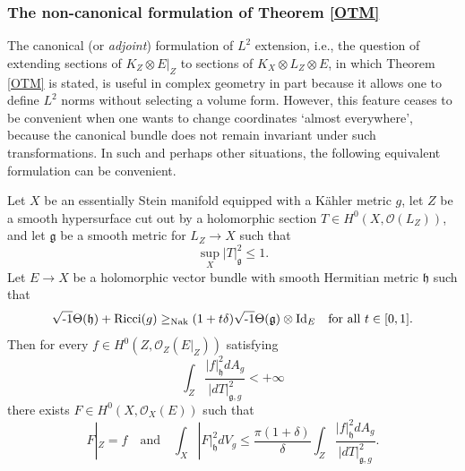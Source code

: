\documentclass[12pt,hidelinks]{amsart}
\newcommand{\cO}{{\mathcal O}}
\newcommand{\fg}{{\mathfrak g}}
\newcommand{\fh}{{\mathfrak h}}
\newcommand{\ii}{\sqrt{\text{\rm -}1}}
\newcommand{\tensor}{\otimes}
\begin{document}
\subsubsection{\sc The non-canonical formulation of Theorem \ref{OTM}}%

The canonical (or \emph{adjoint}) formulation of $L^2$ extension, i.e., the question of extending sections of $K_Z \tensor E|_Z$ to sections of $K_X \tensor L_Z \tensor E$, in which Theorem \ref{OTM} is stated, is useful in complex geometry in part because it allows one to define $L^2$ norms without selecting a volume form.  However, this feature ceases to be convenient when one wants to change coordinates `almost everywhere', because the canonical bundle does not remain invariant under such transformations.  In such and perhaps other situations, the following equivalent formulation can be convenient.

\begin{thm}\label{OTMnc}
Let $X$ be an essentially Stein manifold equipped with a K\"ahler metric $g$, let $Z$ be a smooth hypersurface cut out by a holomorphic section $T \in H^0(X, \cO (L_Z))$, and let $\fg$ be a smooth metric for $L_Z \to X$ such that 
\[
\sup _X |T|^2_{\fg} \le 1.
\]
Let $E \to X$ be a holomorphic vector bundle with smooth Hermitian metric $\fh$ such that 
\begin{equation}\label{curv-hyp-OTnc}
\ii \Theta (\fh) + {\rm Ricci}(g) \ge_{{\rm Nak}} (1+t \delta) \ii \Theta (\fg) \tensor {\rm Id}_E \quad \text{for all }t \in [0,1].
\end{equation}
Then for every $f \in H^0(Z, \cO_Z (E|_{Z}))$ satisfying
\[
\int _Z \frac{|f|^2_{\fh}dA_{g}}{|dT|^2_{\fg,g}} < +\infty
\]
there exists $F \in H^0(X, \cO _X(E))$ such that 
\[
F|_Z = f \quad \text{and} \quad \int _X |F|^2_{\fh} dV_{g}\le \frac{\pi (1+\delta)}{\delta} \int _Z \frac{|f|^2_{\fh} dA_{g}}{|dT|^2_{\fg,g}}.
\]
\end{thm}
\end{document}
